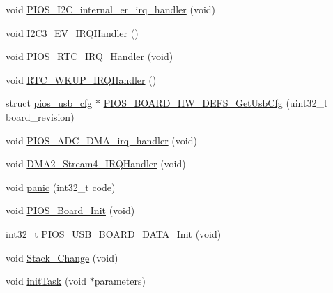 \begin{DoxyCompactItemize}
void \hyperlink{group___quanton_gadc581b03bb219d9dfa3e43f594ae3c94}{\-P\-I\-O\-S\-\_\-\-I2\-C\-\_\-internal\-\_\-er\-\_\-irq\-\_\-handler} (void)
\item 
void \hyperlink{group___quanton_ga749eb918c398cc3f11f47ec317757573}{\-I2\-C3\-\_\-\-E\-V\-\_\-\-I\-R\-Q\-Handler} ()
\item 
void \hyperlink{group___quanton_gadc73bf2eccd9d9ff9d8efedd1e743704}{\-P\-I\-O\-S\-\_\-\-R\-T\-C\-\_\-\-I\-R\-Q\-\_\-\-Handler} (void)
\item 
void \hyperlink{group___quanton_ga7e78266985c97f3b7e8a9f91893657d1}{\-R\-T\-C\-\_\-\-W\-K\-U\-P\-\_\-\-I\-R\-Q\-Handler} ()
\item 
struct \hyperlink{structpios__usb__cfg}{pios\-\_\-usb\-\_\-cfg} $\ast$ \hyperlink{group___quanton_ga9075152ece4596f99329ba0bc3866dc9}{\-P\-I\-O\-S\-\_\-\-B\-O\-A\-R\-D\-\_\-\-H\-W\-\_\-\-D\-E\-F\-S\-\_\-\-Get\-Usb\-Cfg} (uint32\-\_\-t board\-\_\-revision)
\item 
void \hyperlink{group___quanton_gab1b0c9556e9feacd794f636f33e63d90}{\-P\-I\-O\-S\-\_\-\-A\-D\-C\-\_\-\-D\-M\-A\-\_\-irq\-\_\-handler} (void)
\item 
void \hyperlink{group___quanton_ga295198ed574625d416158a5fc54205ea}{\-D\-M\-A2\-\_\-\-Stream4\-\_\-\-I\-R\-Q\-Handler} (void)
\item 
void \hyperlink{group___quanton_ga0e4330d8eb474f118a0acaff588a8c30}{panic} (int32\-\_\-t code)
\item 
void \hyperlink{group___quanton_ga902009c5b1cb57d9f9d60092eb7cacfb}{\-P\-I\-O\-S\-\_\-\-Board\-\_\-\-Init} (void)
\item 
int32\-\_\-t \hyperlink{group___quanton_ga5efd94ab761f254827f38dba474cf642}{\-P\-I\-O\-S\-\_\-\-U\-S\-B\-\_\-\-B\-O\-A\-R\-D\-\_\-\-D\-A\-T\-A\-\_\-\-Init} (void)
\item 
void \hyperlink{group___quanton_ga7a789e7b91612099a4a1f355b9e97c24}{\-Stack\-\_\-\-Change} (void)
\item 
void \hyperlink{group___quanton_gae7ecc4ed0ea5858477b78acaf928c3ef}{init\-Task} (void $\ast$parameters)
\end{DoxyCompactItemize}
